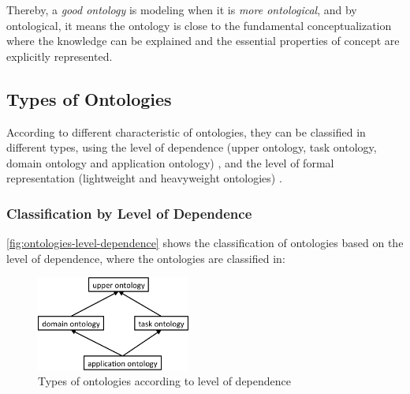 Thereby, a \emph{good ontology} is modeling when it is \emph{more ontological}, and by ontological, it means the ontology is close to the fundamental conceptualization where the knowledge can be explained and the essential properties of concept are explicitly represented.

\subsection{Types of Ontologies}
\label{subsec:types-otologies}

According to different characteristic of ontologies, they can be classified in different types, using the level of dependence (upper ontology, task ontology, domain ontology and application ontology) \cite{Guarino1997a}, and the level of formal representation (lightweight and heavyweight ontologies) \cite{WongLiuBennamoun2012}. 

\subsubsection{Classification by Level of Dependence}
\label{subsubsec:classification-level-dependence}


\autoref{fig:ontologies-level-dependence} shows the classification of ontologies based on the level of dependence, where the ontologies are classified in:

\begin{figure}[htb]
 \caption{Types of ontologies according to level of dependence}
 \label{fig:ontologies-level-dependence}
 \centering
 \includegraphics[width=0.45\textwidth]{images/chap-general-background/ontologies-level-dependence.png}
\end{figure}

